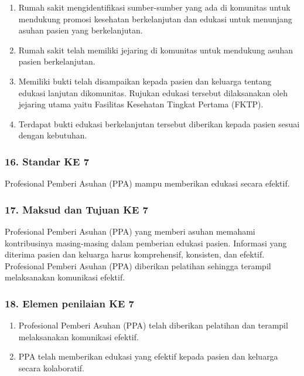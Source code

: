 \documentclass[
]{book}
\providecommand{\tightlist}{%
  \setlength{\itemsep}{0pt}\setlength{\parskip}{0pt}}
\begin{document}
\begin{enumerate}
\def\labelenumi{\alph{enumi}.}
\tightlist
\item
  Rumah sakit mengidentifikasi sumber-sumber yang ada di komunitas untuk mendukung promosi kesehatan berkelanjutan dan edukasi untuk menunjang asuhan pasien yang berkelanjutan.
\item
  Rumah sakit telah memiliki jejaring di komunitas untuk mendukung asuhan pasien berkelanjutan.
\item
  Memiliki bukti telah disampaikan kepada pasien dan keluarga tentang edukasi lanjutan dikomunitas. Rujukan edukasi tersebut dilaksanakan oleh jejaring utama yaitu Fasilitas Kesehatan Tingkat Pertama (FKTP).
\item
  Terdapat bukti edukasi berkelanjutan tersebut diberikan kepada pasien sesuai dengan kebutuhan.
\end{enumerate}

\hypertarget{standar-ke-7}{%
\subsubsection*{16. Standar KE 7}\label{standar-ke-7}}

Profesional Pemberi Asuhan (PPA) mampu memberikan edukasi secara efektif.

\hypertarget{maksud-dan-tujuan-ke-7}{%
\subsubsection*{17. Maksud dan Tujuan KE 7}\label{maksud-dan-tujuan-ke-7}}

Profesional Pemberi Asuhan (PPA) yang memberi asuhan memahami kontribusinya masing-masing dalam pemberian edukasi pasien. Informasi yang diterima pasien dan keluarga harus komprehensif, konsisten, dan efektif. Profesional Pemberi Asuhan (PPA) diberikan pelatihan sehingga terampil melaksanakan komunikasi efektif.

\hypertarget{elemen-penilaian-ke-7}{%
\subsubsection*{18. Elemen penilaian KE 7}\label{elemen-penilaian-ke-7}}

\begin{enumerate}
\def\labelenumi{\alph{enumi}.}
\tightlist
\item
  Profesional Pemberi Asuhan (PPA) telah diberikan pelatihan dan terampil melaksanakan komunikasi efektif.
\item
  PPA telah memberikan edukasi yang efektif kepada pasien dan keluarga secara kolaboratif.
\end{enumerate}
\end{document}
